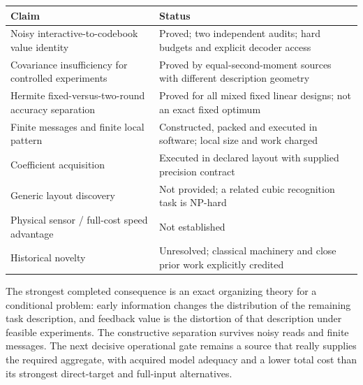\documentclass[11pt]{article}
\begin{document}
\begin{center}
\begin{tabularx}{\textwidth}{@{}p{}X@{}}
\toprule
Claim & Status \\
\midrule
Noisy interactive-to-codebook value identity & Proved; two independent audits; hard budgets and explicit decoder access \\
Covariance insufficiency for controlled experiments & Proved by equal-second-moment sources with different description geometry \\
Hermite fixed-versus-two-round accuracy separation & Proved for all mixed fixed linear designs; not an exact fixed optimum \\
Finite messages and finite local pattern & Constructed, packed and executed in software; local size and work charged \\
Coefficient acquisition & Executed in declared layout with supplied precision contract \\
Generic layout discovery & Not provided; a related cubic recognition task is NP-hard \\
Physical sensor / full-cost speed advantage & Not established \\
Historical novelty & Unresolved; classical machinery and close prior work explicitly credited \\
\bottomrule
\end{tabularx}
\end{center}

The strongest completed consequence is an exact organizing theory for a conditional problem: early information changes the distribution of the remaining task description, and feedback value is the distortion of that description under feasible experiments. The constructive separation survives noisy reads and finite messages. The next decisive operational gate remains a source that really supplies the required aggregate, with acquired model adequacy and a lower total cost than its strongest direct-target and full-input alternatives.
\end{document}
